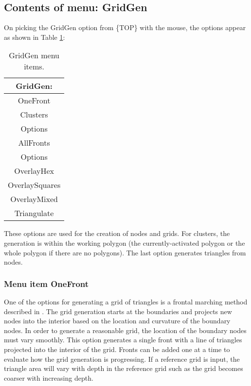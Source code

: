 \documentclass{article}
\begin{document}
\subsection{Contents of menu: GridGen}
On picking the GridGen option from \{TOP\} with the mouse, the options appear as shown in Table \ref{tab:GRIDGEN}:

\begin{table}[htb!]
 \caption{GridGen menu items.}
  \begin{center}
   \begin{tabular}{|c|}
    \hline
GridGen:\\     \hline
OneFront \\     \hline
Clusters \\ Options \\     \hline
AllFronts \\ Options \\     \hline
OverlayHex \\ OverlaySquares \\ OverlayMixed \\     \hline
Triangulate \\
    \hline
   \end{tabular}
   \label{tab:GRIDGEN}
  \end{center}
\end{table}


These options are used for the creation of nodes and grids. For clusters, the generation is within the working polygon (the currently-activated polygon or the whole polygon if there are no polygons). The last option generates triangles from nodes. 

\subsubsection[Menu item OneFront]{Menu item OneFront}
One of the options for generating a grid of triangles is a frontal marching method described in \cite{LO1998,S1980}. The grid generation starts at the boundaries and projects new nodes into the interior based on the location and curvature of the boundary nodes. In order to generate a reasonable grid, the location of the boundary nodes must vary smoothly. This option generates a single front with a line of triangles projected into the interior of the grid. Fronts can be added one at a time to evaluate how the grid generation is progressing. If a reference grid is input, the triangle area will vary with depth in the reference grid such as the grid becomes coarser with increasing depth.  
\end{document}
